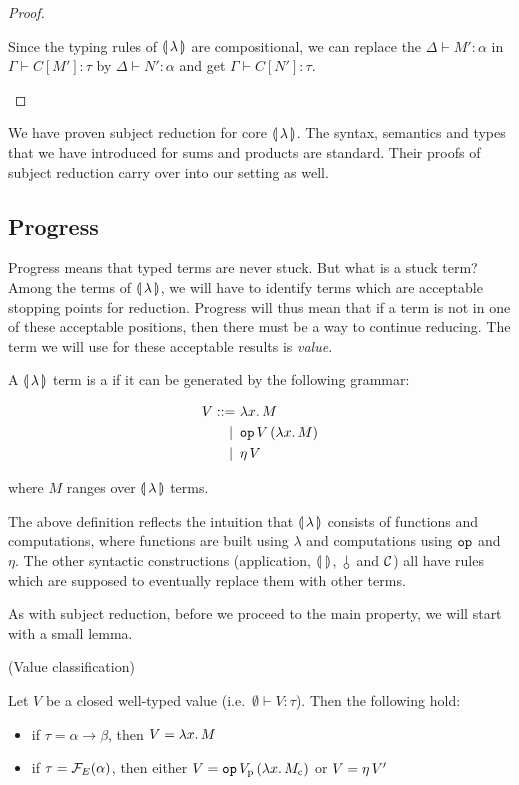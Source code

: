 \begin{proof}
\begin{itemize}
    Since the typing rules of $\llparenthesis \, \lambda \, \rrparenthesis$ are compositional, we can
    replace the $\Delta \vdash M' : \alpha$ in $\Gamma \vdash C[M'] : \tau$
    by $\Delta \vdash N' : \alpha$ and get $\Gamma \vdash C[N'] : \tau$.
  \end{itemize}
\end{proof}

We have proven subject reduction for core $\llparenthesis \, \lambda \, \rrparenthesis$. The syntax,
semantics and types that we have introduced for sums and products are
standard. Their proofs of subject reduction carry over into our setting as
well.


\subsection{Progress}
\label{ssec:progress}

Progress means that typed terms are never stuck. But what is a stuck term?
Among the terms of $\llparenthesis \, \lambda \, \rrparenthesis$, we will have to identify terms which
are acceptable stopping points for reduction. Progress will thus mean that
if a term is not in one of these acceptable positions, then there must be a
way to continue reducing. The term we will use for these acceptable results
is \emph{value}.

\begin{definition}\label{def:value}
  A $\llparenthesis \, \lambda \, \rrparenthesis$ term is a  if it can be generated by
  the following grammar:

\begin{align*}
  V ::= &\ \lambda x.\, M \\
   | \, &\ \mathtt{op}\,V\,(\lambda x.\, M) \\
   | \, &\ \eta\,V
\end{align*}

  where $M$ ranges over $\llparenthesis \, \lambda \, \rrparenthesis$ terms.
\end{definition}

The above definition reflects the intuition that $\llparenthesis \, \lambda \, \rrparenthesis$
consists of functions and computations, where functions are built using
$\lambda$ and computations using $\mathtt{op}$ and $\eta$. The other syntactic
constructions (application, $\llparenthesis \,  \, \rrparenthesis$, $\cherry$ and $\mathcal{C}$) all have
rules which are supposed to eventually replace them with other terms.

As with subject reduction, before we proceed to the main property, we will
start with a small lemma.

\begin{lemma}\label{lem:value-classification}
  (Value classification)

  Let $V$ be a closed well-typed value (i.e.\ $\emptyset \vdash V :
  \tau$). Then the following hold:

  \begin{itemize}
  \item if $\tau = \alpha \to \beta$, then $V = \lambda x.\, M$
  \item if $\tau = \mathcal{F}_E(\alpha)$, then either
    $V = \mathtt{op}\,V_{\mathrm{p}}\,(\lambda x.\, M_{\mathrm{c}})$ or $V = \eta\,V'$
  \end{itemize}
\end{lemma}

